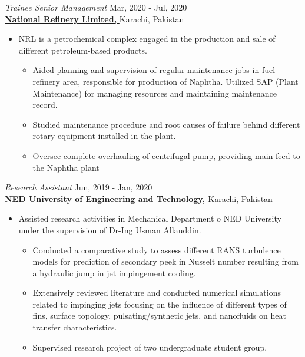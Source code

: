 \documentclass[margin, 10pt]{res} %
\begin{document}
\begin{resume}




\emph{Trainee Senior Management} \hfill {\small Mar, 2020 -  Jul, 2020} \\
\href{http://www.nrlpak.com/}{\textbf{National Refinery Limited, }} Karachi, Pakistan
\begin{itemize}
    \item NRL is a petrochemical complex engaged in the production and sale of different petroleum-based products. 
    \begin{itemize}
        \item Aided planning and supervision of regular maintenance jobs in fuel refinery area, responsible for production of Naphtha. Utilized SAP (Plant Maintenance) for managing resources and maintaining maintenance record.
        \item Studied maintenance procedure and root causes of failure behind different rotary equipment installed in the plant.
        \item Oversee complete overhauling of centrifugal pump, providing main feed to the Naphtha plant

    \end{itemize}
\end{itemize}



\emph{Research Assistant} \hfill {\small Jun, 2019 -  Jan, 2020} \\
\href{https://www.neduet.edu.pk/}{\textbf{NED University of Engineering and Technology, \href{https://www.neduet.edu.pk/}{}}} Karachi, Pakistan
\begin{itemize}
    \item Assisted research activities in Mechanical Department o NED University under the supervision of \href{https://scholar.google.com/citations?user=jOthSmQAAAAJ&hl=en}{Dr-Ing Usman Allauddin}.
    
    \begin{itemize}
        \item Conducted a comparative study to assess different RANS turbulence models for prediction of secondary peek in Nusselt number resulting from a hydraulic jump in jet impingement cooling.
        \item Extensively reviewed literature and conducted numerical simulations related to impinging jets focusing on the influence of different types of fins, surface topology, pulsating/synthetic jets, and nanofluids on heat transfer characteristics.
        \item Supervised research project of two undergraduate student group. 
    \end{itemize}
\end{itemize}




\end{resume}
\end{document}

